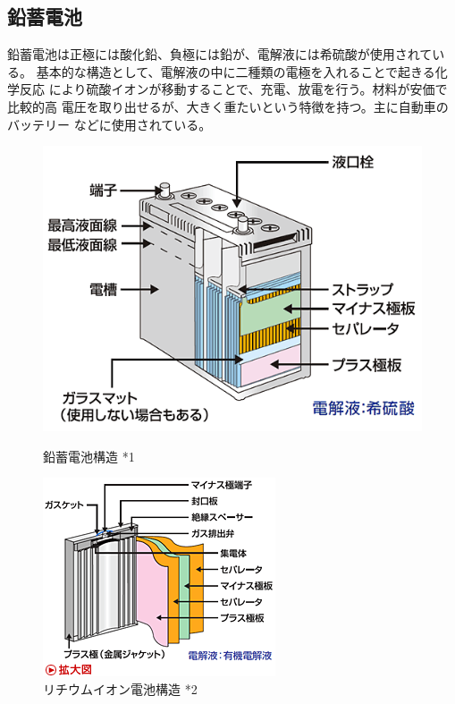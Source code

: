 \documentclass[dvipdfmx,autodetect-engine,titlepage]{jsarticle}
\begin{document}
  \subsection{鉛蓄電池}
  鉛蓄電池は正極には酸化鉛、負極には鉛が、電解液には希硫酸が使用されている。
  基本的な構造として、電解液の中に二種類の電極を入れることで起きる化学反応
  により硫酸イオンが移動することで、充電、放電を行う。材料が安価で比較的高
  電圧を取り出せるが、大きく重たいという特徴を持つ。主に自動車のバッテリー
  などに使用されている。
  \begin{figure}[h]
    \begin{minipage}[b]{0.45\linewidth}
    \begin{center}
      \includegraphics[keepaspectratio,scale=0.3]{SodaPDF-converted-pic1.png}
      \end{center}
      \caption{鉛蓄電池構造 *1}
    \end{minipage}
    \begin{minipage}[b]{0.45\linewidth}
    \begin{center}
      \includegraphics[keepaspectratio,scale=0.5]{SodaPDF-converted-pic2.png}
      \end{center}
      \caption{リチウムイオン電池構造 *2}
    \end{minipage}
  \end{figure}
\end{document}
